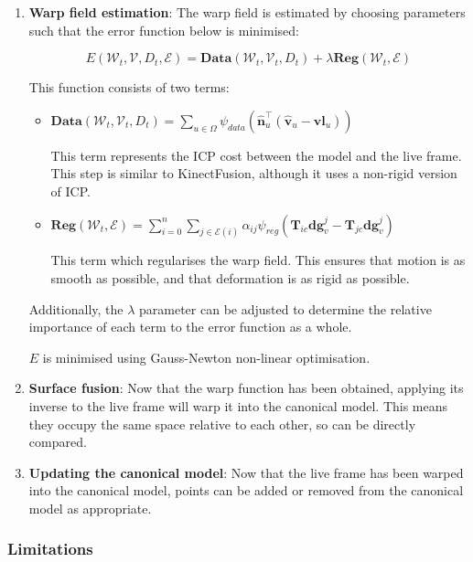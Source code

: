 \documentclass[a4paper]{article}
\begin{document}
\begin{enumerate}
\item \textbf{Warp field estimation}: The warp field is estimated by choosing parameters such that the error function below is minimised:

$$E(\mathcal{W}_t, \mathcal{V}, D_t, \mathcal{E}) = \textbf{Data}(\mathcal{W}_t, \mathcal{V}_t, D_t) + \lambda\textbf{Reg}(\mathcal{W}_t, \mathcal{E})$$ 

This function consists of two terms:
\begin{itemize}
\item $\textbf{Data}(\mathcal{W}_t, \mathcal{V}_t, D_t) = \sum\limits_{u \in \Omega} \psi_{data}(\hat{\textbf{n}}_u^\top (\hat{\textbf{v}}_u - \textbf{vl}_u))$ 

This term represents the ICP cost between the model and the live frame. This step is similar to KinectFusion, although it uses a non-rigid version of ICP.

\item $\textbf{Reg}(\mathcal{W}_t, \mathcal{E}) = \sum\limits_{i=0}^n\sum\limits_{j \in \mathcal{E}(i)}\alpha_{ij}\psi_{reg}(\textbf{T}_{ic}\textbf{dg}^j_v - \textbf{T}_{jc}\textbf{dg}^j_v)$ 

This term which regularises the warp field. This ensures that motion is as smooth as possible, and that deformation is as rigid as possible.
\end{itemize}

Additionally, the $\lambda$ parameter can be adjusted to determine the relative importance of each term to the error function as a whole.

$E$ is minimised using Gauss-Newton non-linear optimisation.

\item \textbf{Surface fusion}: Now that the warp function has been obtained, applying its inverse to the live frame will warp it into the canonical model. This means they occupy the same space relative to each other, so can be directly compared.

\item \textbf{Updating the canonical model}: Now that the live frame has been warped into the canonical model, points can be added or removed from the canonical model as appropriate. 
\end{enumerate}

\subsubsection{Limitations}
\end{document}

